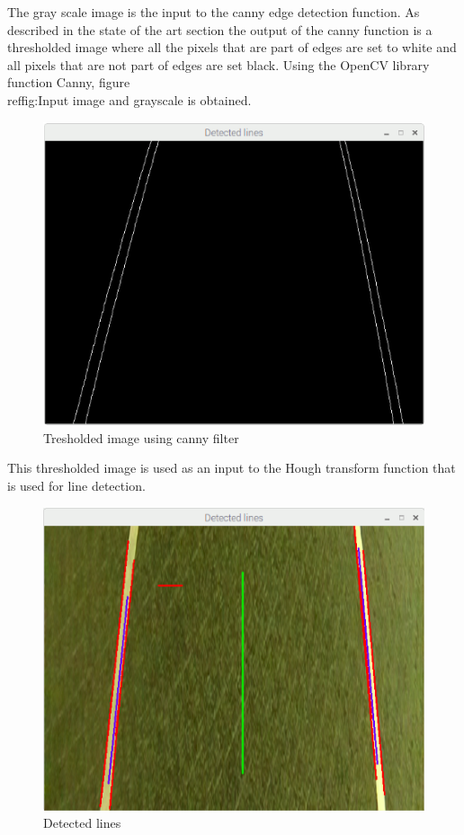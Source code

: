 The gray scale image is the input to the canny edge detection function. As described in the state of the art section the output of the canny function is a thresholded image where all the pixels that are part of edges are set to white and all pixels that are not part of edges are set black. Using the OpenCV library function Canny, figure \\ref{fig:Input image and grayscale} is obtained.

\begin{figure}[H]
  \includegraphics[width=\textwidth]{./img/edges22.png}
  \centering
  \caption{Tresholded image using canny filter}
  \label{fig:Tresholded image using canny filter}
\end{figure}

This thresholded image is used as an input to the Hough transform function that is used for line detection.


\begin{figure}[H]
  \includegraphics[width=\textwidth]{./img/detected.png}
  \centering
  \caption{Detected lines}
  \label{fig:Detected lines}
\end{figure}

